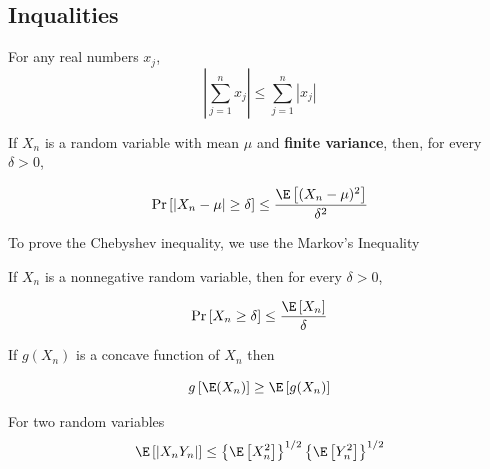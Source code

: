 \documentclass[english,12pt]{book}\usepackage[]{graphicx}\usepackage[]{xcolor}
\begin{document}
\begin{subappendices}

 \section{Inqualities}\label{appendix-inequalities}


\begin{definition}\label{def:triangle-inequality}
For any real numbers $x_j$, 
\begin{equation}
  \left|\sum_{j= 1}^n x_j\right| \leq \sum_{j = 1}^n \left|x_j\right|
\end{equation}
\end{definition}

\begin{definition}\label{definition:chebyshev_ineq}
	 If $X_n$ is a random variable with mean $\mu$ and \textbf{finite variance}, then, for every $\delta > 0$,
	 
	 \begin{equation*}
	 \Pr\left[\left| X_n - \mu\right|\geq \delta \right]\leq \frac{\E\left[(X_n - \mu)^2\right]}{\delta ^2}
	 \end{equation*}
\end{definition}

To prove the Chebyshev inequality, we use the Markov's Inequality

\begin{definition}\label{definition:chebyshev_ineq}
	 If $X_n$ is a nonnegative random variable, then for every $\delta > 0$,
	 
	 \begin{equation*}
	 \Pr\left[X_n \geq \delta \right]\leq \frac{\E\left[X_n\right]}{\delta}
	 \end{equation*}
\end{definition}

\begin{definition}\label{theorem:Jansen-Inequality}
If $g(X_n)$ is a concave function of $X_n$ then

\begin{equation*}
  g\left[\E(X_n)\right] \geq \E\left[g(X_n)\right]
\end{equation*}
\end{definition}

\begin{definition}\label{theorem:Cauchy-Inequality}
For two random variables
\begin{equation*}
  \E\left[\left|X_nY_n\right|\right]\leq \left\lbrace \E\left[X_n^2\right]\right\rbrace^{1/2} \left\lbrace \E\left[Y_n^2\right]\right\rbrace^{1/2} 
\end{equation*}
\end{definition}


\end{subappendices}
\end{document}
